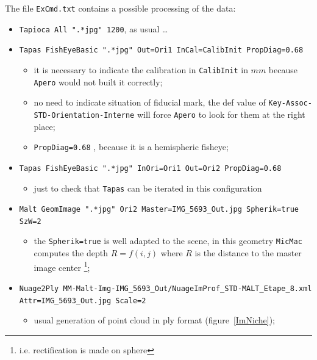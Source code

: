 The file {\tt ExCmd.txt} contains a possible processing of the data:


\begin{itemize}
    \item {\tt Tapioca  All ".*jpg"  1200}, as usual \dots
    \item {\tt Tapas  FishEyeBasic  ".*jpg"  Out=Ori1 InCal=CalibInit PropDiag=0.68}

     \begin{itemize}
          \item  it is necessary to indicate the calibration in {\tt CalibInit} in $mm$ because {\tt Apero}
                 would not built it correctly;
          \item no need to indicate situation of fiducial mark, the def value of {\tt Key-Assoc-STD-Orientation-Interne}
                will force {\tt Apero} to look for them at the right place;
           \item {\tt PropDiag=0.68} , because it is a hemispheric fisheye;
      \end{itemize}

    \item {\tt Tapas FishEyeBasic ".*jpg" InOri=Ori1  Out=Ori2 PropDiag=0.68}
    \begin{itemize}
           \item  just to check that {\tt Tapas} can be iterated in  this  configuration
    \end{itemize}
    \item {\tt Malt GeomImage ".*jpg" Ori2 Master=IMG\_5693\_Out.jpg Spherik=true SzW=2}
    \begin{itemize}
             \item the {\tt Spherik=true} is well adapted  to the scene, in this geometry
                   {\tt MicMac} computes the depth  $R=f(i,j)$ where $R$ is the distance
                   to the master image center \footnote{i.e. rectification is made on sphere};
    \end{itemize}

    \item {\tt Nuage2Ply MM-Malt-Img-IMG\_5693\_Out/NuageImProf\_STD-MALT\_Etape\_8.xml Attr=IMG\_5693\_Out.jpg Scale=2}

    \begin{itemize}
             \item usual generation of point cloud in ply format (figure~\ref{ImNiche});
    \end{itemize}

\end{itemize}





